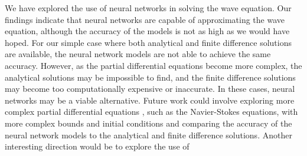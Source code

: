 \documentclass[twoside,11pt]{report}
\begin{document}
    We have explored the use of neural networks in solving the wave equation. Our findings indicate that
    neural networks are capable of approximating the wave equation, although the accuracy of the models
    is not as high as we would have hoped. For our simple case where both analytical and finite difference
    solutions are available, the neural network models are not able to achieve the same accuracy. 
    However, as the partial differential equations become
    more complex, the analytical solutions may be impossible to find, and the finite difference solutions
    may become too computationally expensive or inaccurate. In these cases, neural networks may be a
    viable alternative.
    Future work could involve exploring more complex partial differential equations , such as the
    Navier-Stokes equations, with more complex bounds and initial conditions 
    and comparing the accuracy of the neural network models to the analytical
    and finite difference solutions. Another interesting direction would be to explore the use of


    
    
     










%
%
%
%




\vskip 0.2in


% 
\end{document}
